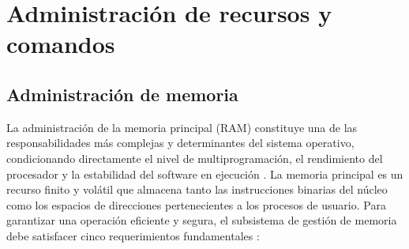 \documentclass[12pt]{article}
\begin{document}
\section{Administración de recursos y comandos}\label{sec:administracionRecursosComandos}

\subsection{Administración de memoria}\label{sec:administracionMemoria}

La administración de la memoria principal (RAM) constituye una de las responsabilidades más complejas y determinantes del sistema operativo, condicionando directamente el nivel de multiprogramación, el rendimiento del procesador y la estabilidad del software en ejecución \parencite[\S 7.1, p.\ 314]{stallings2018operating}. La memoria principal es un recurso finito y volátil que almacena tanto las instrucciones binarias del núcleo como los espacios de direcciones pertenecientes a los procesos de usuario. Para garantizar una operación eficiente y segura, el subsistema de gestión de memoria debe satisfacer cinco requerimientos fundamentales \parencite[\S 7.1, pp.\ 315--318]{stallings2018operating}:
\end{document}
